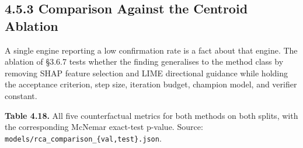 \hypertarget{comparison-against-the-centroid-ablation}{%
\subsection{4.5.3 Comparison Against the Centroid Ablation}\label{comparison-against-the-centroid-ablation}}

A single engine reporting a low confirmation rate is a fact about that engine. The ablation of §3.6.7 tests whether the finding generalises to the method class by removing SHAP feature selection and LIME directional guidance while holding the acceptance criterion, step size, iteration budget, champion model, and verifier constant.

\textbf{Table 4.18.} All five counterfactual metrics for both methods on both splits, with the corresponding McNemar exact-test p-value. Source: \texttt{models/rca\_comparison\_\{val,test\}.json}.

